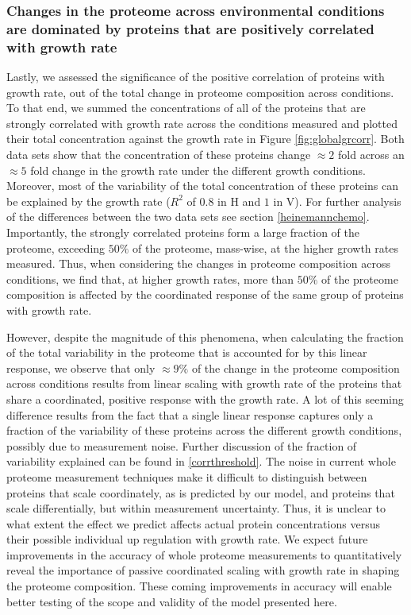 \subsubsection{Changes in the proteome across environmental conditions are dominated by proteins that are positively correlated with growth rate}
Lastly, we assessed the significance of the positive correlation of proteins with growth rate, out of the total change in proteome composition across conditions.
To that end, we summed the concentrations of all of the proteins that are strongly correlated with growth rate across the conditions measured and plotted their total concentration against the growth rate in Figure \ref{fig:globalgrcorr}.
Both data sets show that the concentration of these proteins change $\approx 2$ fold across an $\approx 5$ fold change in the growth rate under the different growth conditions.
Moreover, most of the variability of the total concentration of these proteins can be explained by the growth rate ($R^2$ of $0.8$ in H and $1$ in V). 
For further analysis of the differences between the two data sets see section \ref{heinemannchemo}.
Importantly, the strongly correlated proteins form a large fraction of the proteome, exceeding $50\%$ of the proteome, mass-wise, at the higher growth rates measured.
Thus, when considering the changes in proteome composition across conditions, we find that, at higher growth rates, more than $50\%$ of the proteome composition is affected by the coordinated response of the same group of proteins with growth rate.

However, despite the magnitude of this phenomena, when calculating the fraction of the total variability in the proteome that is accounted for by this linear response, we observe that only $\approx 9\%$ of the change in the proteome composition across conditions results from linear scaling with growth rate of the proteins that share a coordinated, positive response with the growth rate.
A lot of this seeming difference results from the fact that a single linear response captures only a fraction of the variability of these proteins across the different growth conditions, possibly due to measurement noise.
Further discussion of the fraction of variability explained can be found in \ref{corrthreshold}.
The noise in current whole proteome measurement techniques make it difficult to distinguish between proteins that scale coordinately, as is predicted by our model, and proteins that scale differentially, but within measurement uncertainty.
Thus, it is unclear to what extent the effect we predict affects actual protein concentrations versus their possible individual up regulation with growth rate.
We expect future improvements in the accuracy of whole proteome measurements to quantitatively reveal the importance of passive coordinated scaling with growth rate in shaping the proteome composition. These coming improvements in accuracy will enable better testing of the scope and validity of the model presented here.